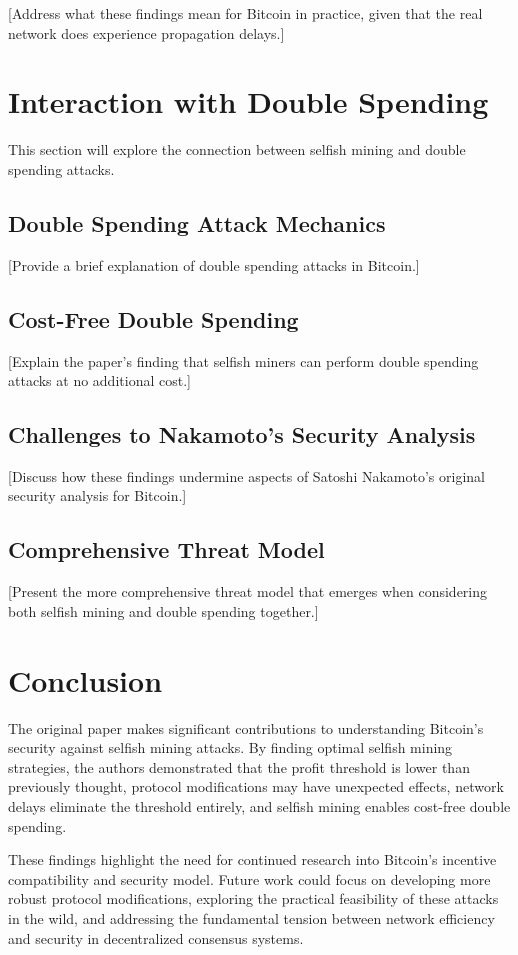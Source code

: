 \documentclass[conference]{IEEEtran}
\begin{document}
[Address what these findings mean for Bitcoin in practice, given that the real network does experience propagation delays.]

\section{Interaction with Double Spending}

This section will explore the connection between selfish mining and double spending attacks.

\subsection{Double Spending Attack Mechanics}

[Provide a brief explanation of double spending attacks in Bitcoin.]

\subsection{Cost-Free Double Spending}

[Explain the paper's finding that selfish miners can perform double spending attacks at no additional cost.]

\subsection{Challenges to Nakamoto's Security Analysis}

[Discuss how these findings undermine aspects of Satoshi Nakamoto's original security analysis for Bitcoin.]

\subsection{Comprehensive Threat Model}

[Present the more comprehensive threat model that emerges when considering both selfish mining and double spending together.]

\section{Conclusion}

The original paper makes significant contributions to understanding Bitcoin's security against selfish mining attacks. By finding optimal selfish mining strategies, the authors demonstrated that the profit threshold is lower than previously thought, protocol modifications may have unexpected effects, network delays eliminate the threshold entirely, and selfish mining enables cost-free double spending.

These findings highlight the need for continued research into Bitcoin's incentive compatibility and security model. Future work could focus on developing more robust protocol modifications, exploring the practical feasibility of these attacks in the wild, and addressing the fundamental tension between network efficiency and security in decentralized consensus systems.



\end{document}
